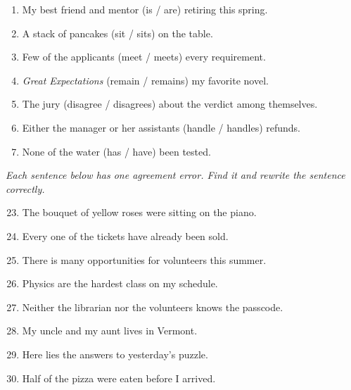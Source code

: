 \documentclass[11pt]{article}
\begin{document}
\begin{enumerate}
  \item My best friend and mentor (is / are) retiring this spring.
  \vspace{6pt}
  \item A stack of pancakes (sit / sits) on the table.
  \vspace{6pt}
  \item Few of the applicants (meet / meets) every requirement.
  \vspace{6pt}
  \item \textit{Great Expectations} (remain / remains) my favorite novel.
  \vspace{6pt}
  \item The jury (disagree / disagrees) about the verdict among themselves.
  \vspace{6pt}
  \item Either the manager or her assistants (handle / handles) refunds.
  \vspace{6pt}
  \item None of the water (has / have) been tested.
  \vspace{6pt}
\end{enumerate}

\noindent\textit{Each sentence below has one agreement error. Find it and rewrite the sentence correctly.}
\begin{enumerate}\setcounter{enumi}{22}
  \item The bouquet of yellow roses were sitting on the piano.
  \vspace{0.5in}
  \item Every one of the tickets have already been sold.
  \vspace{0.5in}
  \item There is many opportunities for volunteers this summer.
  \vspace{0.5in}
  \item Physics are the hardest class on my schedule.
  \vspace{0.5in}
  \item Neither the librarian nor the volunteers knows the passcode.
  \vspace{0.5in}
  \item My uncle and my aunt lives in Vermont.
  \vspace{0.5in}
  \item Here lies the answers to yesterday's puzzle.
  \vspace{0.5in}
  \item Half of the pizza were eaten before I arrived.
  \vspace{0.5in}
\end{enumerate}
\end{document}
